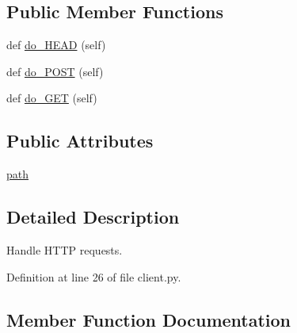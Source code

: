 \subsection*{Public Member Functions}
\begin{DoxyCompactItemize}
\item 
def \hyperlink{classparlai_1_1chat__service_1_1services_1_1browser__chat_1_1client_1_1BrowserHandler_a8364ce2f5f1ff8e26a1b4c27a1393281}{do\+\_\+\+H\+E\+AD} (self)
\item 
def \hyperlink{classparlai_1_1chat__service_1_1services_1_1browser__chat_1_1client_1_1BrowserHandler_ab1502fd0b8faee9c61c7147237e4bcaf}{do\+\_\+\+P\+O\+ST} (self)
\item 
def \hyperlink{classparlai_1_1chat__service_1_1services_1_1browser__chat_1_1client_1_1BrowserHandler_a9376548266c12b7e6a83ebe167b8c5c8}{do\+\_\+\+G\+ET} (self)
\end{DoxyCompactItemize}
\subsection*{Public Attributes}
\begin{DoxyCompactItemize}
\item 
\hyperlink{classparlai_1_1chat__service_1_1services_1_1browser__chat_1_1client_1_1BrowserHandler_a0422e5814dadd67804c8da0d83794375}{path}
\end{DoxyCompactItemize}


\subsection{Detailed Description}
\begin{DoxyVerb}Handle HTTP requests.
\end{DoxyVerb}
 

Definition at line 26 of file client.\+py.



\subsection{Member Function Documentation}
\mbox{\label{classparlai_1_1chat__service_1_1services_1_1browser__chat_1_1client_1_1BrowserHandler_a9376548266c12b7e6a83ebe167b8c5c8}} 
